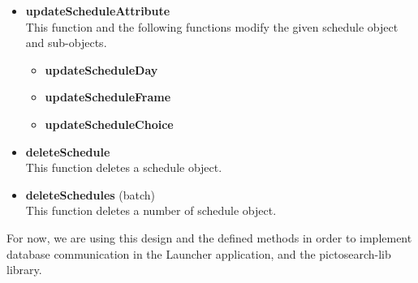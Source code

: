 \begin{itemize}
\begin{itemize}
    \end{itemize}
    \item \textbf{updateScheduleAttribute}\\
    This function and the following functions modify the given schedule object and sub-objects.
    \begin{itemize}
        \item \textbf{updateScheduleDay}
        \item \textbf{updateScheduleFrame}
        \item \textbf{updateScheduleChoice}
    \end{itemize}
    \item \textbf{deleteSchedule}\\
    This function deletes a schedule object.
    \item \textbf{deleteSchedules} (batch)\\
    This function deletes a number of schedule object.
\end{itemize}

For now, we are using this design and the defined methods in order to implement
database communication in the Launcher application, and the pictosearch-lib
library.
